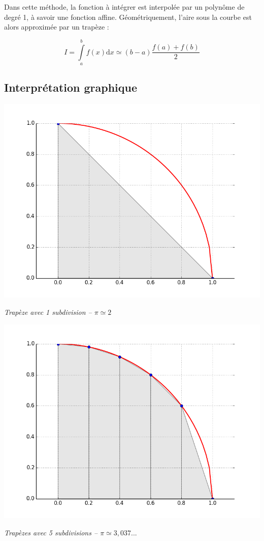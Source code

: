 \documentclass[10pt]{article}
\begin{document}
\begin{defi}
Dans cette méthode, la fonction à intégrer est interpolée par un polynôme de degré 1, à savoir une fonction affine. Géométriquement, l'aire sous la courbe est alors approximée par un trapèze :

$$
I = \int\limits_a^{b} f(x) \mathrm{d}x \simeq \left(b-a\right) \dfrac{f(a)+f(b)}{2} 
$$

\end{defi}

\subsection{Interprétation graphique}
\begin{minipage}[c]{.3\linewidth}
\begin{center}
\includegraphics[width=.99\textwidth]{images/CourbesPython/pi_trap_1}

\textit{Trapèze avec 1 subdivision -- $\pi \simeq 2$}
\end{center}
\end{minipage}\hfill
\begin{minipage}[c]{.3\linewidth}
\begin{center}
\includegraphics[width=.99\textwidth]{images/CourbesPython/pi_trap}

\textit{Trapèzes avec 5 subdivisions -- $\pi \simeq 3,037...$  }
\end{center}
\end{minipage} \hfill
\end{document}
